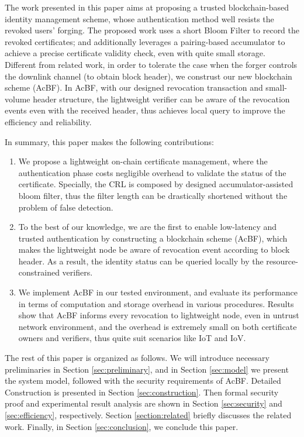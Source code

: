 \documentclass[conference]{IEEEtran}
\begin{document}
The work presented in this paper aims at proposing a trusted blockchain-based identity management scheme, whose authentication method well resists the revoked users' forging. The proposed work uses a short Bloom Filter to record the revoked certificates; and additionally leverages a pairing-based accumulator to achieve a precise certificate validity check, even with quite small storage. Different from related work, in order to tolerate the case when the forger controls the downlink channel (to obtain block header), we construst our new blockchain scheme (AcBF). In AcBF, with our designed revocation transaction and small-volume header structure, the lightweight verifier can be aware of the revocation events even with the received header, thus achieves local query to improve the efficiency and reliability. 

In summary, this paper makes the following contributions:
\begin{enumerate}
	\item We propose a lightweight on-chain certificate management, where the authentication phase costs negligible overhead to validate the status of the certificate. Specially, the CRL is composed by designed accumulator-assisted bloom filter, thus the filter length can be drastically shortened without the problem of false detection. 
	\item To the best of our knowledge, we are the first to enable low-latency and trusted authentication by constructing a blockchain scheme (AcBF), which makes the lightweight node be aware of revocation event according to block header. As a result, the identity status can be queried locally by the resource-constrained verifiers.
	\item We implement AcBF in our tested environment, and evaluate its performance in terms of computation and storage overhead in various procedures. Results show that AcBF informs every revocation to lightweight node, even in untrust network environment, and the overhead is extremely small on both certificate owners and verifiers, thus quite suit scenarios like IoT and IoV.
\end{enumerate}

The rest of this paper is organized as follows. We will
introduce necessary preliminaries in Section \ref{sec:preliminary}, and in Section \ref{sec:model} we present the system model, followed with the security requirements of AcBF. Detailed Construction is presented in Section \ref{sec:construction}. Then formal security proof and experimental result analysis are shown in Section \ref{sec:security} and \ref{sec:efficiency}, respectively. Section \ref{section:related} briefly discusses the related work. Finally, in Section \ref{sec:conclusion}, we conclude this paper. 
\end{document}
